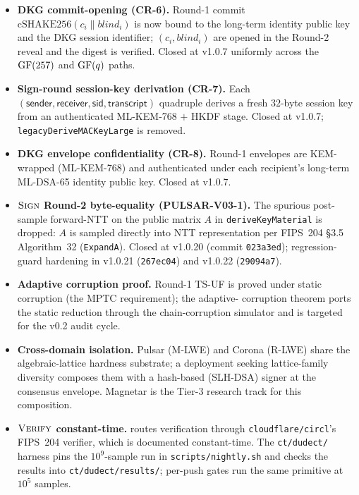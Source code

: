 \begin{itemize}[leftmargin=*, itemsep=0pt]
\item \textbf{DKG commit-opening (CR-6).} Round-1 commit
$\mathrm{cSHAKE256}(c_i \| \mathit{blind}_i)$ is now bound to the
long-term identity public key and the DKG session identifier;
$(c_i, \mathit{blind}_i)$ are opened in the Round-2 reveal and the
digest is verified. Closed at v1.0.7 uniformly across the
$\mathrm{GF}(257)$ and $\mathrm{GF}(q)$ paths.
\item \textbf{Sign-round session-key derivation (CR-7).}
Each $(\textsf{sender}, \textsf{receiver}, \textsf{sid},
\textsf{transcript})$ quadruple derives a fresh $32$-byte session
key from an authenticated ML-KEM-768 $+$ HKDF stage. Closed at
v1.0.7; \texttt{legacyDeriveMACKeyLarge} is removed.
\item \textbf{DKG envelope confidentiality (CR-8).} Round-1
envelopes are KEM-wrapped (ML-KEM-768) and authenticated under
each recipient's long-term ML-DSA-65 identity public key. Closed
at v1.0.7.
\item \textbf{$\textsc{Sign}$ Round-2 byte-equality (PULSAR-V03-1).} The
spurious post-sample forward-NTT on the public matrix $A$ in
\texttt{deriveKeyMaterial} is dropped: $A$ is sampled directly
into NTT representation per FIPS~204 \S3.5 Algorithm~32
(\texttt{ExpandA}). Closed at v1.0.20 (commit \texttt{023a3ed});
regression-guard hardening in v1.0.21 (\texttt{267ec04}) and
v1.0.22 (\texttt{29094a7}).
\item \textbf{Adaptive corruption proof.} Round-1 TS-UF is proved
under static corruption (the MPTC requirement); the adaptive-
corruption theorem ports the static reduction through the
chain-corruption simulator and is targeted for the v0.2 audit
cycle.
\item \textbf{Cross-domain isolation.} Pulsar (M-LWE) and Corona
(R-LWE) share the algebraic-lattice hardness substrate; a
deployment seeking lattice-family diversity composes them with a
hash-based (SLH-DSA) signer at the consensus envelope. Magnetar
is the Tier-3 research track for this composition.
\item \textbf{$\textsc{Verify}$ constant-time.}  routes
verification through \texttt{cloudflare/circl}'s FIPS~204
verifier, which is documented constant-time. The
\texttt{ct/dudect/} harness pins the $10^9$-sample run in
\texttt{scripts/nightly.sh} and checks the results into
\texttt{ct/dudect/results/}; per-push gates run the same primitive
at $10^5$ samples.
\end{itemize}

